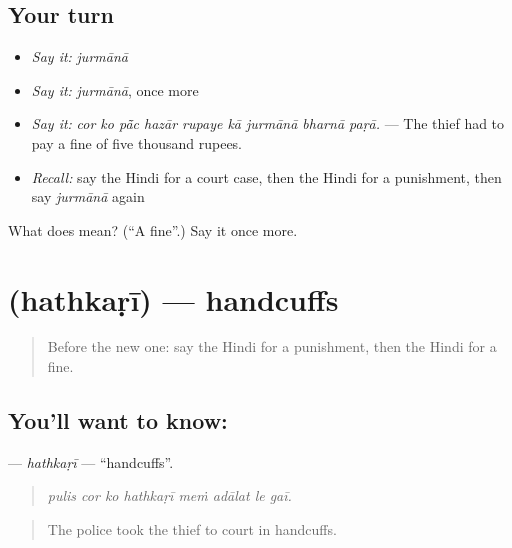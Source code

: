 \subsection*{Your turn}
\begin{itemize}
\raggedright
  \item \emph{Say it:} \emph{jurmānā}
  \item \emph{Say it:} \emph{jurmānā}, once more
  \item \emph{Say it:} \emph{cor ko pā̃c hazār rupaye kā jurmānā bharnā paṛā.} — The thief had to pay a fine of five thousand rupees.
  \item \emph{Recall:} say the Hindi for a court case, then the Hindi for a punishment, then say \emph{jurmānā} again
\end{itemize}

\begin{tcolorbox}[breakable,colback=teal!4,colframe=teal!35!black,title={Before you move on}]
What does  mean? (\textquotedblleft{}A fine\textquotedblright{}.) Say it once more.
\end{tcolorbox}
\section[\texorpdfstring{\hi{हथकड़ी} (hathkaṛī)}{हथकड़ी (hathkaṛī)}]{ (hathkaṛī) — handcuffs}

\label{lesson:HI-C295-hathkari}



\begin{quote}
Before the new one: say the Hindi for a punishment, then the Hindi for a fine.
\end{quote}

\subsection*{You'll want to know: }
\textbf{} — \emph{hathkaṛī} — \textquotedblleft{}handcuffs\textquotedblright{}.

\begin{quote}
       
\end{quote}

\begin{quote}
\emph{pulis cor ko hathkaṛī meṁ adālat le gaī.}
\end{quote}

\begin{quote}
The police took the thief to court in handcuffs.
\end{quote}

